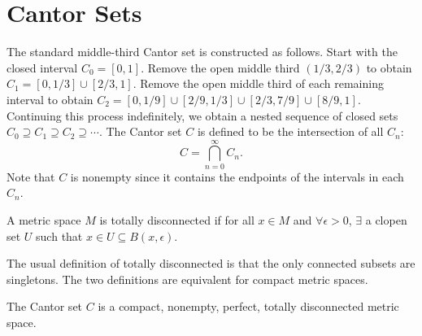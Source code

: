 \chapter{Cantor Sets}

The standard middle-third Cantor set is constructed as follows. Start with the closed interval $C_0 = [0, 1]$. Remove the open middle third $(1/3, 2/3)$ to obtain $C_1 = [0, 1/3] \cup [2/3, 1]$. Remove the open middle third of each remaining interval to obtain $C_2 = [0, 1/9] \cup [2/9, 1/3] \cup [2/3, 7/9] \cup [8/9, 1]$. Continuing this process indefinitely, we obtain a nested sequence of closed sets $C_0 \supseteq C_1 \supseteq C_2 \supseteq \cdots$. The Cantor set $C$ is defined to be the intersection of all $C_n$:
\[
C = \bigcap_{n=0}^\infty C_n.
\]
Note that $C$ is nonempty since it contains the endpoints of the intervals in each $C_n$.

\begin{df}
    A metric space $M$ is totally disconnected if for all $x \in M$ and $\forall \epsilon > 0$, $\exists$ a clopen set $U$ such that $x \in U \subseteq B(x, \epsilon)$.
\end{df}

\begin{rmk}
    The usual definition of totally disconnected is that the only connected subsets are singletons. The two definitions are equivalent for compact metric spaces.
\end{rmk}

\begin{thm}
    The Cantor set $C$ is a compact, nonempty, perfect, totally disconnected metric space.
\end{thm}